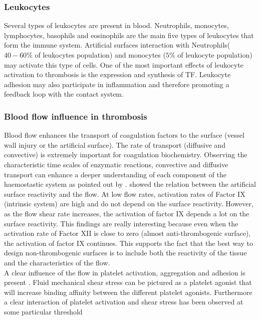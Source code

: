 \documentclass[%
 nofootinbib,
 amsmath,amssymb,
 aps,
 pra,
]{revtex4-1}
\begin{document}
\subsubsection{Leukocytes}
Several types of leukocytes are present in blood. Neutrophils, monocytes, lymphocytes, basophils and eosinophils are the main five types of leukocytes that form the immune system. Artificial surfaces interaction with Neutrophils($40-60 \%$ of leukocytes population) and monocytes ($5 \%$ of leukocyte population) may activate this type of cells. One of the most important effects of leukocyte activation to thrombosis is the expression and synthesis of TF. Leukocyte adhesion may also participate in inflammation and therefore promoting a feedback loop with the contact system.\\

\subsubsection{Blood flow influence in thrombosis}
Blood flow enhances the transport of coagulation factors to the surface (vessel wall injury or the artificial surface). The rate of transport (diffusive and convective) is extremely important for coagulation biochemistry. Observing the characteristic time scales of enzymatic reactions, convective and diffusive transport can enhance a deeper understanding of each component of the haemostastic system as pointed out by \citet{Rana:2016}.    
\citet{Basmadjian:1997} showed the relation between the artificial surface reactivity and the flow. At low flow rates, activation rates of Factor IX (intrinsic system) are high and do not depend on  the surface reactivity. However, as the flow shear rate increases, the activation of factor IX depends a lot on the surface reactivity. This findings are really interesting because even when the activation rate of Factor XII is close to zero (almost anti-thrombogenic surface), the activation of factor IX continues. This supports the fact that the best way to design non-thrombogenic surfaces is to include both the reactivity of the tissue and the characteristics of the flow.\\
A clear influence of the flow in platelet activation, aggregation and adhesion is present \citep{Hellums:1994,Turitto:1975,Grabowski:1972}. Fluid mechanical shear stress can be pictured as a platelet agonist that will increase binding affinity between the different platelet agonists. Furthermore a clear interaction of platelet activation and shear stress has been observed at some particular threshold %
\end{document}
